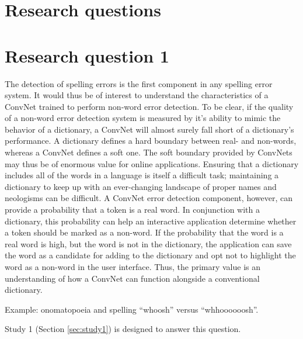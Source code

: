 \section{Research questions}
\label{sec:questions}

\section{Research question 1}
\label{sec:question1}


The detection of spelling errors is the first component in any spelling error system.  It would thus be of interest to understand the characteristics of a ConvNet trained to perform non-word error detection.  To be clear, if the quality of a non-word error detection system is measured by it's ability to mimic the behavior of a dictionary, a ConvNet will almost surely fall short of a dictionary's performance.  A dictionary defines a hard boundary between real- and non-words, whereas a ConvNet defines a soft one.  The soft boundary provided by ConvNets may thus be of enormous value for online applications.  Ensuring that a dictionary includes all of the words in a language is itself a difficult task; maintaining a dictionary to keep up with an ever-changing landscape of proper names and neologisms can be difficult.   A ConvNet error detection component, however, can provide a probability that a token is a real word.  In conjunction with a dictionary, this probability can help an interactive application determine whether a token should be marked as a non-word.  If the probability that the word is a real word is high, but the word is not in the dictionary, the application can save the word as a candidate for adding to the dictionary and opt not to highlight the word as a non-word in the user interface.  Thus, the primary value is an understanding of how a ConvNet can function alongside a conventional dictionary. 

Example: onomatopoeia and spelling ``whoosh'' versus ``whhoooooosh''.


Study 1 (Section \ref{sec:study1}) is designed to answer this question.

